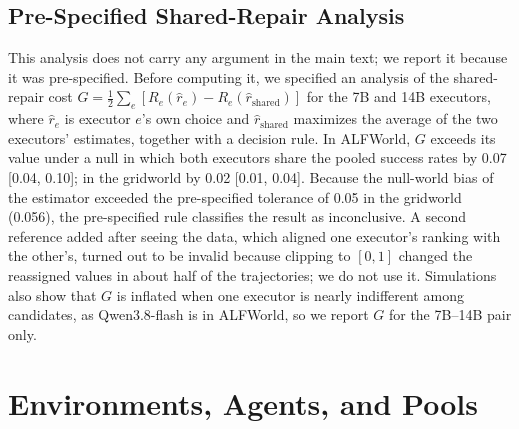 \documentclass{article}
\theoremstyle{plain}
\theoremstyle{definition}
\theoremstyle{remark}
\begin{document}
\subsection{Pre-Specified Shared-Repair Analysis}
\label{app:share}

This analysis does not carry any argument in the main text; we report it because it was pre-specified. Before computing it, we specified an analysis of the shared-repair cost $G=\frac12\sum_{e}[R_e(\hat r_e)-R_e(\hat r_{\mathrm{shared}})]$ for the 7B and 14B executors, where $\hat r_e$ is executor $e$'s own choice and $\hat r_{\mathrm{shared}}$ maximizes the average of the two executors' estimates, together with a decision rule. In ALFWorld, $G$ exceeds its value under a null in which both executors share the pooled success rates by 0.07 [0.04, 0.10]; in the gridworld by 0.02 [0.01, 0.04]. Because the null-world bias of the estimator exceeded the pre-specified tolerance of 0.05 in the gridworld (0.056), the pre-specified rule classifies the result as inconclusive. A second reference added after seeing the data, which aligned one executor's ranking with the other's, turned out to be invalid because clipping to $[0,1]$ changed the reassigned values in about half of the trajectories; we do not use it. Simulations also show that $G$ is inflated when one executor is nearly indifferent among candidates, as Qwen3.8-flash is in ALFWorld, so we report $G$ for the 7B--14B pair only.

\section{Environments, Agents, and Pools}
\label{app:setup}
\end{document}
